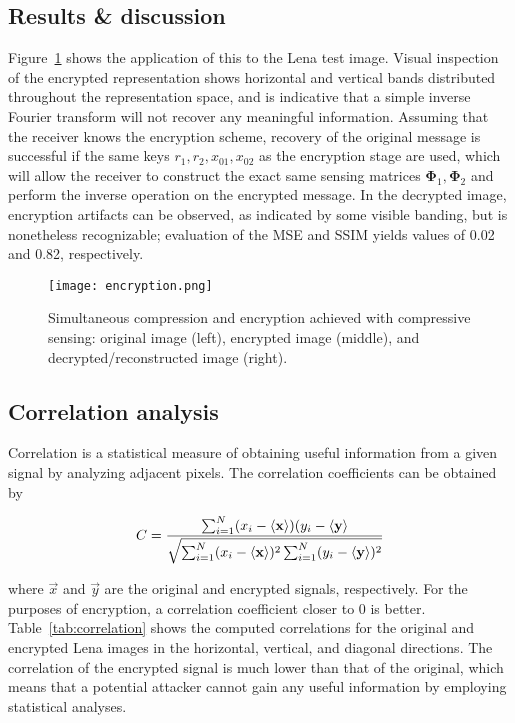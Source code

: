 \subsection{Results \& discussion}
\label{ssec:image-encrypt-rnd}
Figure~\ref{fig:encryption} shows the application of this to the Lena test image. Visual inspection of the encrypted representation shows horizontal and vertical bands distributed throughout the representation space, and is indicative that a simple inverse Fourier transform will not recover any meaningful information. Assuming that the receiver knows the encryption scheme, recovery of the original message is successful if the same keys $r_1, r_2, x_{01}, x_{02}$ as the encryption stage are used, which will allow the receiver to construct the exact same sensing matrices $\bm\Phi_1, \bm\Phi_2$ and perform the inverse operation on the encrypted message. In the decrypted image, encryption artifacts can be observed, as indicated by some visible banding, but is nonetheless recognizable; evaluation of the MSE and SSIM yields values of 0.02 and 0.82, respectively.

\begin{figure}[htb]
	\texttt{[image: encryption.png]}
	\caption{Simultaneous compression and encryption achieved with compressive sensing: original image (left), encrypted image (middle), and decrypted/reconstructed image (right).}
	\label{fig:encryption}
\end{figure}

\subsection{Correlation analysis}
\label{ssec:image-encrypt-correlation}
Correlation is a statistical measure of obtaining useful information from a given signal by analyzing adjacent pixels. The correlation coefficients can be obtained by

\begin{equation}
	\label{eq:correlation-coeff}
	C = \frac{\sum_{i=1}^N (x_i - \ev{\vec{x}}) (y_i - \ev{\vec{y}}}{\sqrt{\sum_{i=1}^N (x_i - \ev{\vec{x}})^2 \sum_{i=1}^N (y_i - \ev{\vec{y}})^2}}
\end{equation}

\noindent where $\vec{x}$ and $\vec{y}$ are the original and encrypted signals, respectively. For the purposes of encryption, a correlation coefficient closer to 0 is better. Table~\ref{tab:correlation} shows the computed correlations for the original and encrypted Lena images in the horizontal, vertical, and diagonal directions. The correlation of the encrypted signal is much lower than that of the original, which means that a potential attacker cannot gain any useful information by employing statistical analyses.

